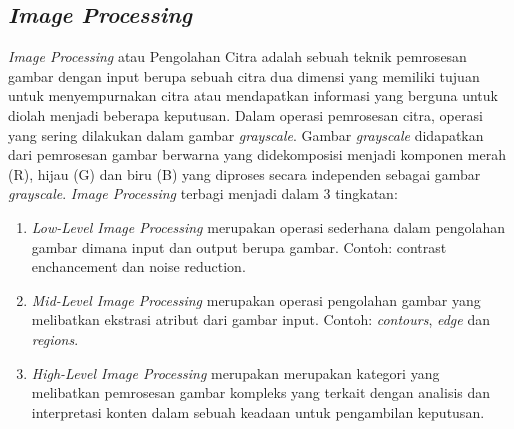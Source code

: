 \subsection{\emph{Image Processing}}
\label{sec:image-Processing}

\emph{Image Processing} atau Pengolahan Citra adalah sebuah teknik
pemrosesan gambar dengan input berupa sebuah citra dua dimensi yang memiliki tujuan untuk menyempurnakan citra atau mendapatkan
informasi yang berguna untuk diolah menjadi beberapa keputusan. Dalam operasi pemrosesan citra, operasi yang sering dilakukan
dalam gambar \emph{grayscale}. Gambar \emph{grayscale} didapatkan dari pemrosesan gambar berwarna yang didekomposisi menjadi komponen
merah (R), hijau (G) dan biru (B) yang diproses secara independen
sebagai gambar \emph{grayscale}. \emph{Image Processing} terbagi menjadi dalam 3 tingkatan:

\begin{enumerate}
  \item \emph{Low-Level Image Processing} merupakan operasi sederhana dalam pengolahan gambar dimana input dan output berupa gambar. Contoh: contrast enchancement dan noise reduction.
  \item \emph{Mid-Level Image Processing} merupakan operasi pengolahan
  gambar yang melibatkan ekstrasi atribut dari gambar input.
  Contoh: \emph{contours}, \emph{edge} dan \emph{regions}.
  \item \emph{High-Level Image Processing} merupakan merupakan kategori
  yang melibatkan pemrosesan gambar kompleks yang terkait
  dengan analisis dan interpretasi konten dalam sebuah keadaan
  untuk pengambilan keputusan.
\end{enumerate}

